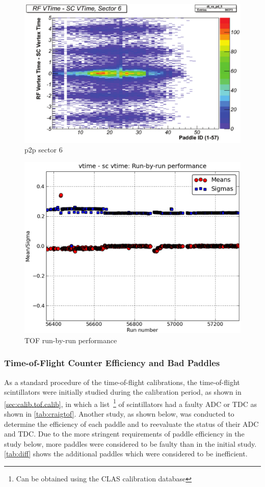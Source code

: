 \begin{figure}\begin{center}
    \includegraphics[width=.40\linewidth]{figures/calib/tof/Tof_56855_final_s6p2p.pdf}
    \caption{p2p sector 6}
    \label{plt:tofsec6}
\end{center}\end{figure}

\begin{figure}\begin{center}
    \includegraphics[width=.40\linewidth]{figures/calib/tof/Tof_runscan_p0v7.eps}
    \caption{TOF run-by-run performance}
    \label{plt:tofrunbyrun}
\end{center}\end{figure}

\subsubsection{\label{sec:calib.tof.eff}Time-of-Flight Counter Efficiency and Bad Paddles}

As a standard procedure of the time-of-flight calibrations, the time-of-flight scintillators were initially studied during the calibration period, as shown in \ref{sec:calib.tof.calib}, in which a list~\footnote{Can be obtained using the CLAS calibration database} of scintillators had a faulty ADC or TDC as shown in \ref{tab:craigtof}. Another study, as shown below, was conducted to determine the efficiency of each paddle and to reevaluate the status of their ADC and TDC. Due to the more stringent requirements of paddle efficiency in the study below, more paddles were considered to be faulty than in the initial study. \ref{tab:diff} shows the additional paddles which were considered to be inefficient.


